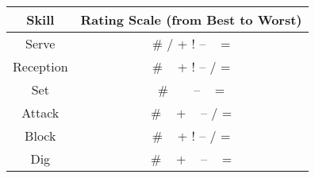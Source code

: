 \color{blue}
\begin{tabular}{cc}
  Skill     & Rating Scale (from Best to Worst)\\
  \hline
  Serve     & \# \quad / \quad + \quad ! \quad -- \quad ~ \quad =\\
  Reception & \# \quad ~ \quad + \quad ! \quad -- \quad / \quad =\\
  Set       & \# \quad ~ \quad {\color{white}+} \quad ~ \quad -- \quad ~ \quad =\\
  Attack    & \# \quad ~ \quad + \quad ~ \quad -- \quad / \quad =\\
  Block     & \# \quad ~ \quad + \quad ! \quad -- \quad / \quad =\\
  Dig       & \# \quad ~ \quad + \quad ~ \quad -- \quad ~ \quad =\\
\end{tabular}